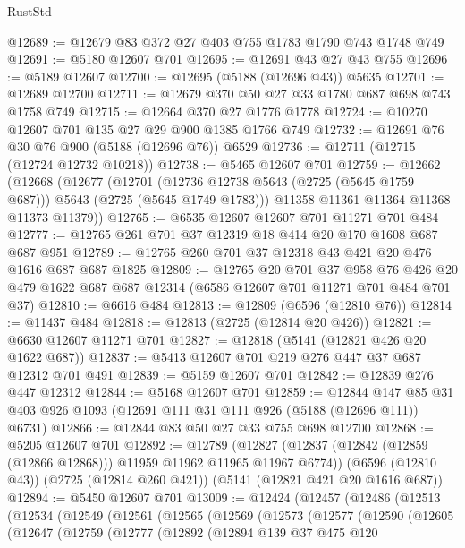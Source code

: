 \begin{lexlean}{RustStd}
\begin{coremodule}
@12689 := @12679 @83 @372 @27 @403 @755 @1783 @1790 @743 @1748 @749
@12691 := @5180 @12607 @701
@12695 := @12691 @43 @27 @43 @755
@12696 := @5189 @12607
@12700 := @12695 (@5188 (@12696 @43)) @5635
@12701 := @12689 @12700
@12711 := @12679 @370 @50 @27 @33 @1780 @687 @698 @743 @1758 @749
@12715 := @12664 @370 @27 @1776 @1778
@12724 := @10270 @12607 @701 @135 @27 @29 @900 @1385 @1766 @749
@12732 := @12691 @76 @30 @76 @900 (@5188 (@12696 @76)) @6529
@12736 := @12711 (@12715 (@12724 @12732 @10218))
@12738 := @5465 @12607 @701
@12759 := @12662
    (@12668
      (@12677
        (@12701 (@12736 @12738 @5643 (@2725 (@5645 @1759 @687))) @5643 (@2725 (@5645 @1749 @1783)))
        @11358
        @11361
        @11364
        @11368
        @11373
        @11379))
@12765 := @6535 @12607 @12607 @701 @11271 @701 @484
@12777 := @12765 @261 @701 @37 @12319 @18 @414 @20 @170 @1608 @687 @687 @951
@12789 := @12765 @260 @701 @37 @12318 @43 @421 @20 @476 @1616 @687 @687 @1825
@12809 := @12765
    @20
    @701
    @37
    @958
    @76
    @426
    @20
    @479
    @1622
    @687
    @687
    @12314
    (@6586 @12607 @701 @11271 @701 @484 @701 @37)
@12810 := @6616 @484
@12813 := @12809 (@6596 (@12810 @76))
@12814 := @11437 @484
@12818 := @12813 (@2725 (@12814 @20 @426))
@12821 := @6630 @12607 @11271 @701
@12827 := @12818 (@5141 (@12821 @426 @20 @1622 @687))
@12837 := @5413 @12607 @701 @219 @276 @447 @37 @687 @12312 @701 @491
@12839 := @5159 @12607 @701
@12842 := @12839 @276 @447 @12312
@12844 := @5168 @12607 @701
@12859 := @12844
    @147
    @85
    @31
    @403
    @926
    @1093
    (@12691 @111 @31 @111 @926 (@5188 (@12696 @111)) @6731)
@12866 := @12844 @83 @50 @27 @33 @755 @698 @12700
@12868 := @5205 @12607 @701
@12892 := @12789
    (@12827 (@12837 (@12842 (@12859 (@12866 @12868))) @11959 @11962 @11965 @11967 @6774))
    (@6596 (@12810 @43))
    (@2725 (@12814 @260 @421))
    (@5141 (@12821 @421 @20 @1616 @687))
@12894 := @5450 @12607 @701
@13009 := @12424
    (@12457
      (@12486
        (@12513
          (@12534
            (@12549
              (@12561
                (@12565
                  (@12569
                    (@12573
                      (@12577
                        (@12590
                          (@12605
                            (@12647
                              (@12759
                                (@12777
                                  (@12892
                                    (@12894
                                      @139
                                      @37
                                      @475
                                      @120

\end{coremodule}
\end{lexlean}

